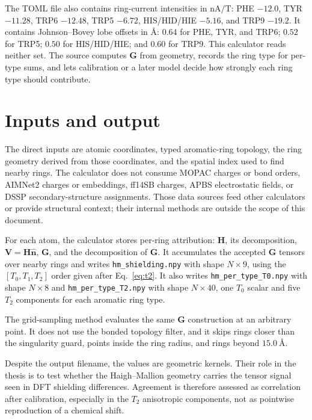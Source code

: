 \documentclass[11pt]{article}
\begin{document}
The TOML file also contains ring-current intensities in \(\si{\nano\ampere\per
\tesla}\): PHE \(-12.0\), TYR \(-11.28\), TRP6 \(-12.48\), TRP5 \(-6.72\),
HIS/HID/HIE \(-5.16\), and TRP9 \(-19.2\). It contains Johnson--Bovey lobe
offsets in \(\si{\angstrom}\): \(0.64\) for PHE, TYR, and TRP6; \(0.52\) for
TRP5; \(0.50\) for HIS/HID/HIE; and \(0.60\) for TRP9. This calculator reads
neither set. The source computes \(\bm G\) from geometry, records the ring type
for per-type sums, and lets calibration or a later model decide how strongly
each ring type should contribute.

\section{Inputs and output}

The direct inputs are atomic coordinates, typed aromatic-ring topology, the
ring geometry derived from those coordinates, and the spatial index used to
find nearby rings. The calculator does not consume MOPAC charges or bond
orders, AIMNet2 charges or embeddings, ff14SB charges, APBS electrostatic
fields, or DSSP secondary-structure assignments. Those data sources feed other
calculators or provide structural context; their internal methods are outside
the scope of this document.

For each atom, the calculator stores per-ring attribution: \(\bm H\), its
decomposition, \(\bm V=\bm H\hat{\bm n}\), \(\bm G\), and the decomposition of
\(\bm G\). It accumulates the accepted \(\bm G\) tensors over nearby rings and
writes \texttt{hm\_shielding.npy} with shape \(N\times9\), using the
\([T_0,T_1,T_2]\) order given after Eq.~\eqref{eq:t2}. It also writes
\texttt{hm\_per\_type\_T0.npy} with shape \(N\times8\) and
\texttt{hm\_per\_type\_T2.npy} with shape \(N\times40\), one \(T_0\) scalar
and five \(T_2\) components for each aromatic ring type.

The grid-sampling method evaluates the same \(\bm G\) construction at an
arbitrary point. It does not use the bonded topology filter, and it skips rings
closer than the singularity guard, points inside the ring radius, and rings
beyond \(\SI{15.0}{\angstrom}\).

Despite the output filename, the values are geometric kernels. Their role in
the thesis is to test whether the Haigh--Mallion geometry carries the tensor
signal seen in DFT shielding differences. Agreement is therefore assessed as
correlation after calibration, especially in the \(T_2\) anisotropic
components, not as pointwise reproduction of a chemical shift.
\end{document}

